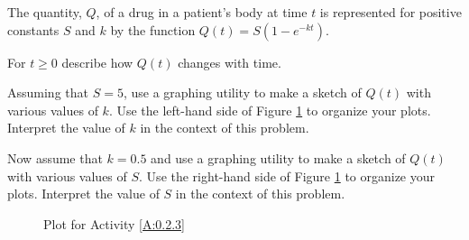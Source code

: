 \begin{activity}\label{A:0.2.3}
The quantity, $Q$, of a drug in a patient's body at time $t$ is represented for positive
constants $S$ and $k$ by the function $Q(t) = S(1-e^{-kt})$. 
\ba
\item For $t \ge 0$ describe how $Q(t)$ changes with time.
\item Assuming that $S = 5$, use a graphing utility to make a sketch of $Q(t)$ with
    various values of $k$.  Use the left-hand side of Figure \ref{F:0.2.Act3} to organize
    your plots.  Interpret the value of $k$ in the context of this problem.
\item Now assume that $k=0.5$ and use a graphing utility to make a sketch of $Q(t)$ with
    various values of $S$.  Use the right-hand side of Figure \ref{F:0.2.Act3} to organize
    your plots.  Interpret the value of $S$ in the context of this problem.
\ea
\begin{figure}[h!]
    \begin{center}
    \end{center}
    \caption{Plot for Activity \ref{A:0.2.3}}
    \label{F:0.2.Act3}
\end{figure}
\end{activity}\aftera

